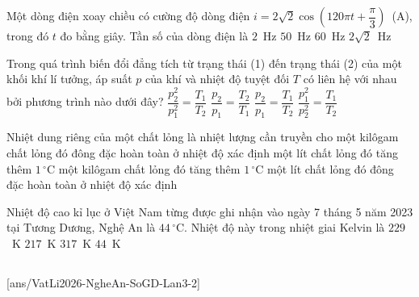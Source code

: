 	\begin{ex}%
		Một dòng điện xoay chiều có cường độ dòng điện $i=2\sqrt{2}\cos\left(120\pi t+\dfrac{\pi}{3}\right)$~(A), trong đó $t$ đo bằng giây. Tần số của dòng điện là
		\choice
		{$2$~Hz}
		{$50$~Hz}
		{\True $60$~Hz}
		{$2\sqrt{2}$~Hz}
	\end{ex}

	\begin{ex}%
		Trong quá trình biến đổi đẳng tích từ trạng thái (1) đến trạng thái (2) của một khối khí lí tưởng, áp suất $p$ của khí và nhiệt độ tuyệt đối $T$ có liên hệ với nhau bởi phương trình nào dưới đây?
		\choice
		{$\dfrac{p_2^2}{p_1^2}=\dfrac{T_1}{T_2}$}
		{\True $\dfrac{p_2}{p_1}=\dfrac{T_2}{T_1}$}
		{$\dfrac{p_2}{p_1}=\dfrac{T_1}{T_2}$}
		{$\dfrac{p_1^2}{p_2^2}=\dfrac{T_1}{T_2}$}
	\end{ex}

	\begin{ex}%
		Nhiệt dung riêng của một chất lỏng là nhiệt lượng cần truyền cho
		\choice
		{một kilôgam chất lỏng đó đông đặc hoàn toàn ở nhiệt độ xác định}
		{một lít chất lỏng đó tăng thêm $1\,^\circ\text{C}$}
		{\True một kilôgam chất lỏng đó tăng thêm $1\,^\circ\text{C}$}
		{một lít chất lỏng đó đông đặc hoàn toàn ở nhiệt độ xác định}
	\end{ex}

	\begin{ex}%
		Nhiệt độ cao kỉ lục ở Việt Nam từng được ghi nhận vào ngày 7 tháng 5 năm 2023 tại Tương Dương, Nghệ An là $44\,^\circ\text{C}$. Nhiệt độ này trong nhiệt giai Kelvin là
		\choice
		{$229$~K}
		{$217$~K}
		{\True $317$~K}
		{$44$~K}
	\end{ex}

	\subsection*{}
	\setcounter{ex}{0}
	[ans/VatLi2026-NgheAn-SoGD-Lan3-2]

